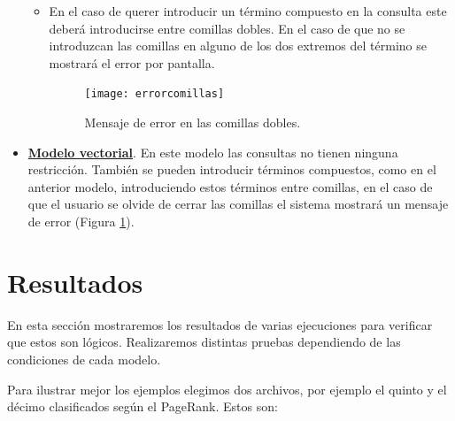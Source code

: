 \documentclass[size=a4, parskip=half, titlepage=false, toc=flat, toc=bib, 12pt]{scrartcl}
\theoremstyle{theorem-style}
\theoremstyle{definition-style}
\theoremstyle{remark-style}
\theoremstyle{example-style}
\theoremstyle{definition-style}
\theoremstyle{remark-style}
\begin{document}
\begin{itemize}
\begin{itemize}
\item En el caso de querer introducir un término compuesto en la consulta este deberá introducirse entre comillas dobles. En el caso de que no se introduzcan las comillas en alguno de los dos extremos del término se mostrará el error por pantalla.
\begin{figure}[H]
\centering
\texttt{[image: errorcomillas]}
\caption{Mensaje de error en las comillas dobles.}
\label{errorcomillasdobles}
\end{figure}
\end{itemize}
\item \textbf{\underline{Modelo vectorial}}. En este modelo las consultas no tienen ninguna restricción. También se pueden introducir términos compuestos, como en el anterior modelo, introduciendo estos términos entre comillas, en el caso de que el usuario se olvide de cerrar las comillas el sistema mostrará un mensaje de error (Figura \ref{errorcomillasdobles}).

\end{itemize}

\newpage

\section{Resultados}
En esta sección mostraremos los resultados de varias ejecuciones para verificar que estos son lógicos. Realizaremos distintas pruebas dependiendo de las condiciones de cada modelo.

Para ilustrar mejor los ejemplos elegimos dos archivos, por ejemplo el quinto y el décimo clasificados según el PageRank. Estos son:
\end{document}
